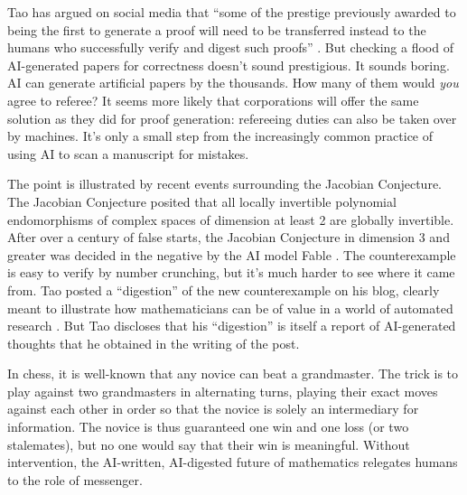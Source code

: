 \documentclass[12pt]{amsart}
\theoremstyle{definition}
\begin{document}
Tao has argued on social media that ``some of the prestige previously awarded to being the first to generate a proof will need to be transferred instead to the humans who successfully verify and digest such proofs'' \cite{taomathstodon}. But checking a flood of AI-generated papers for correctness doesn't sound prestigious. It sounds boring. AI can generate artificial papers by the thousands. How many of them would \emph{you} agree to referee? It seems more likely that corporations will offer the same solution as they did for proof generation: refereeing duties can also be taken over by machines. It's only a small step from the increasingly common practice of using AI to scan a manuscript for mistakes.

The point is illustrated by recent events surrounding the Jacobian Conjecture. The Jacobian Conjecture posited that all locally invertible polynomial endomorphisms of complex spaces of dimension at least 2 are globally invertible.
After over a century of false starts, the Jacobian Conjecture in dimension 3 and greater was decided in the negative by the AI model Fable \cite{fortunefable}. The counterexample is easy to verify by number crunching, but it's much harder to see where it came from. Tao posted a ``digestion'' of the new counterexample on his blog, clearly meant to illustrate how mathematicians can be of value in a world of automated research \cite{taodigestion}. But Tao discloses that his “digestion” is itself a report of AI-generated thoughts that he obtained in the writing of the post.

In chess, it is well-known that any novice can beat a grandmaster. The trick is to play against two grandmasters in alternating turns, playing their exact moves against each other in order so that the novice is solely an intermediary for information. The novice is thus guaranteed one win and one loss (or two stalemates), but no one would say that their win is meaningful. Without intervention, the AI-written, AI-digested future of mathematics relegates humans to the role of messenger.



\end{document}
